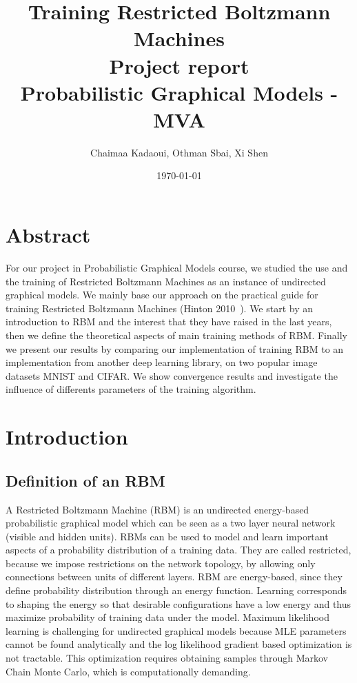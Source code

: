 \documentclass[a4paper,10pt]{article}
\title{%
	\huge{Training Restricted Boltzmann Machines}\\ \bigbreak
  	\Large{Project report}\\ 
  	\Large{Probabilistic Graphical Models - MVA}
}
\author{Chaimaa Kadaoui, Othman Sbai, Xi Shen}
\date\today
\begin{document}
\maketitle
\section{Abstract}
For our project in Probabilistic Graphical Models course, we studied the use and the training of Restricted Boltzmann Machines as an instance of undirected graphical models. We mainly base our approach on the practical guide for training Restricted Boltzmann Machines (Hinton 2010~\cite{hinton2010practical}). We start by an introduction to RBM and the interest that they have raised in the last years, then we define the theoretical aspects of main training methods of RBM. Finally we present our results by comparing our implementation of training RBM to an implementation from another deep learning library, on two popular image datasets MNIST and CIFAR. We show convergence results and investigate the influence of differents parameters of the training algorithm.




\section{Introduction}
\subsection{Definition of an RBM}

A Restricted Boltzmann Machine (RBM) is an undirected energy-based probabilistic graphical model which can be seen as a two layer neural network (visible and hidden units). RBMs can be used to model and learn important aspects of a probability distribution of a training data. They are called restricted, because we impose restrictions on the network topology, by allowing only connections between units of different layers. RBM are energy-based, since they define probability distribution through an energy function. Learning corresponds to shaping the energy so that desirable configurations have a low energy and thus maximize probability of training data under the model. Maximum likelihood learning is challenging for undirected graphical models because MLE parameters cannot be found analytically and the log likelihood gradient based optimization is not tractable. This optimization requires obtaining samples through Markov Chain Monte Carlo, which is computationally demanding.
\end{document}
